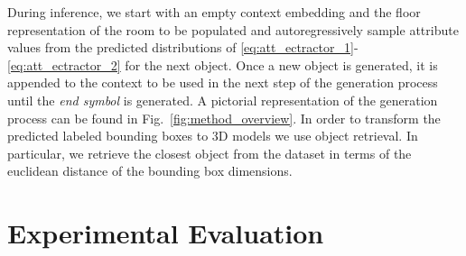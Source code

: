 \documentclass{article}
\newcommand{\figref}[1]{Fig.~\ref{#1}}
\begin{document}
During inference, we start with an empty context embedding  and
the floor representation  of the room to be populated and autoregressively
sample attribute values from the predicted distributions of
\eqref{eq:att_ectractor_1}-\eqref{eq:att_ectractor_2} for the next object.
Once a new object is
generated, it is appended to the context  to be used in the next
step of the generation process until the \emph{end symbol} is generated.  A
pictorial representation of the generation process can be found in
\figref{fig:method_overview}. In order to transform the predicted
labeled bounding boxes to 3D models we use object retrieval. In particular, we
retrieve the closest object from the dataset in terms of the euclidean distance
of the bounding box dimensions.

\vspace{-2mm}
\section{Experimental Evaluation}
\label{sec:results}
\end{document}
